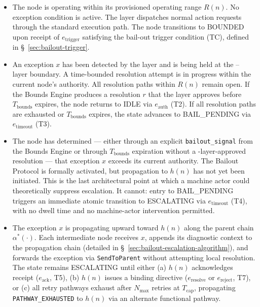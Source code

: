 \begin{itemize}
\item[\textbf{IDLE.}] The node is operating within its provisioned operating range $R(n)$. No exception condition is active. The \fact{} layer dispatches normal action requests through the standard execution path. The node transitions to BOUNDED upon receipt of $e_{\text{trigger}}$ satisfying the bail-out trigger condition (TC), defined in \S~\ref{sec:bailout-trigger}.

\item[\textbf{BOUNDED.}] An exception $x$ has been detected by the \bounds{} layer and is being held at the \bounds{}--\fact{} layer boundary. A time-bounded resolution attempt is in progress within the current node's authority. All resolution paths within $R(n)$ remain open. If the Bounds Engine produces a resolution $r$ that the \fact{} layer approves before $T_{\text{bounds}}$ expires, the node returns to IDLE via $e_{\text{auth}}$ (T2). If all resolution paths are exhausted or $T_{\text{bounds}}$ expires, the state advances to BAIL\_PENDING via $e_{\text{timeout}}$ (T3).

\item[\textbf{BAIL\_PENDING.}] The node has determined --- either through an explicit \texttt{bailout\_signal} from the Bounds Engine or through $T_{\text{bounds}}$ expiration without a \fact-layer-approved resolution --- that exception $x$ exceeds its current authority. The Bailout Protocol is formally activated, but propagation to $h(n)$ has not yet been initiated. This is the last architectural point at which a machine actor could theoretically suppress escalation. It cannot: entry to BAIL\_PENDING triggers an immediate atomic transition to ESCALATING via $e_{\text{timeout}}$ (T4), with no dwell time and no machine-actor intervention permitted.

\item[\textbf{ESCALATING.}] The exception $x$ is propagating upward toward $h(n)$ along the parent chain $\alpha^*(\cdot)$. Each intermediate node receives $x$, appends its diagnostic context to the propagation chain (detailed in \S~\ref{sec:bailout-escalation-algorithm}), and forwards the exception via \texttt{SendToParent} without attempting local resolution. The state remains ESCALATING until either (a) $h(n)$ acknowledges receipt ($e_{\text{ack}}$, T5), (b) $h(n)$ issues a binding directive ($e_{\text{resolve}}$ or $e_{\text{reject}}$, T7), or (c) all retry pathways exhaust after $N_{\max}$ retries at $T_{\text{cap}}$, propagating \texttt{PATHWAY\_EXHAUSTED} to $h(n)$ via an alternate functional pathway.


\end{itemize}
